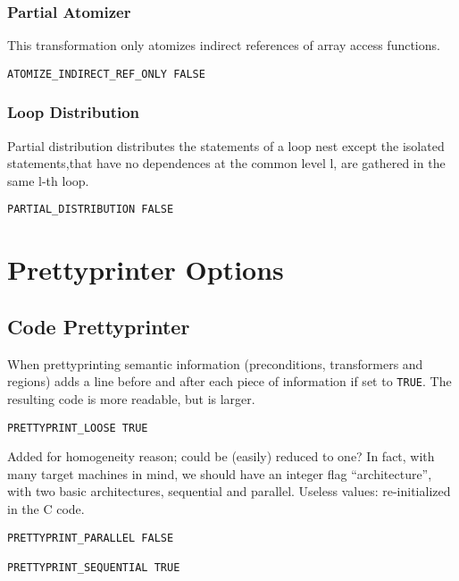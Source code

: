 \subsubsection{Partial Atomizer}

This transformation only atomizes indirect references of array access
functions.

\begin{verbatim}
ATOMIZE_INDIRECT_REF_ONLY FALSE
\end{verbatim}

\subsubsection{Loop Distribution}

Partial distribution distributes the statements of a loop nest except
 the isolated statements,that have no dependences at the common level l,
 are gathered in the same l-th loop.

\begin{verbatim}
PARTIAL_DISTRIBUTION FALSE
\end{verbatim}

\section{Prettyprinter Options}
\label{section-prettyprinters}

\subsection{Code Prettyprinter}

When prettyprinting semantic information (preconditions, transformers and
regions) adds a line before and after each piece of information if set to
\verb+TRUE+. The resulting code is more readable, but is larger.  

\begin{verbatim}
PRETTYPRINT_LOOSE TRUE 
\end{verbatim}

Added for homogeneity reason; could be (easily) reduced to one?  In
fact, with many target machines in mind, we should have an integer flag
``architecture'', with two basic architectures, sequential and parallel.
Useless values: re-initialized in the C code.

\begin{verbatim}
PRETTYPRINT_PARALLEL FALSE

PRETTYPRINT_SEQUENTIAL TRUE
\end{verbatim}

